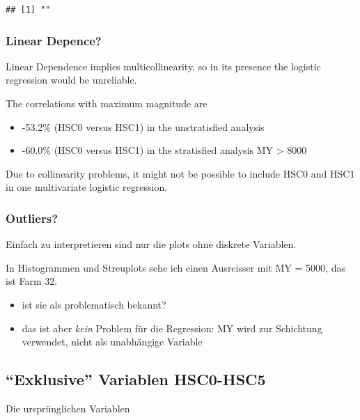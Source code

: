 \documentclass[
]{article}
\providecommand{\tightlist}{%
  \setlength{\itemsep}{0pt}\setlength{\parskip}{0pt}}
\begin{document}
\begin{verbatim}
## [1] ""
\end{verbatim}

\hypertarget{linear-depence}{%
\subsubsection{Linear Depence?}\label{linear-depence}}

Linear Dependence implies multicollinearity, so in its presence the
logistic regression would be unreliable.

The correlations with maximum magnitude are

\begin{itemize}
\tightlist
\item
  -53.2\% (HSC0 versus HSC1) in the unstratisfied analysis
\item
  -60.0\% (HSC0 versus HSC1) in the stratisfied analysis MY
  \textgreater{} 8000
\end{itemize}

Due to collinearity problems, it might not be possible to include HSC0
and HSC1 in one multivariate logistic regression.

\hypertarget{outliers}{%
\subsubsection{Outliers?}\label{outliers}}

Einfach zu interpretieren sind nur die plots ohne diskrete Variablen.

In Histogrammen und Streuplots sehe ich einen Ausreisser mit MY = 5000,
das ist Farm 32.

\begin{itemize}
\tightlist
\item
  ist sie als problematisch bekannt?
\item
  das ist aber \emph{kein} Problem für die Regression: MY wird zur
  Schichtung verwendet, nicht als unabhängige Variable
\end{itemize}

\hypertarget{exklusive-variablen-hsc0-hsc5}{%
\subsection{``Exklusive'' Variablen
HSC0-HSC5}\label{exklusive-variablen-hsc0-hsc5}}

Die ursprünglichen Variablen
\end{document}
